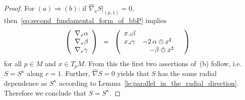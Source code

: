 \documentclass[11pt,a4paper]{article}
\theoremstyle{plain}
\theoremstyle{remark}
\begin{document}
\begin{proof}
For $(a)\Rightarrow (b)$: if $\hat\nabla_x S|_{(p,1)} = 0$, then~\eqref{eq:second_fundamental_form_of_bbP} implies
\begin{equation*}
\left (  \begin{array}{l}
 \nabla_x \alpha \\
\nabla_x\beta\\
\nabla_x\gamma
\end{array} \right )\;\;=\;\;\left (  \begin{array}{lll}
x\lrcorner \beta & & \\
x\lrcorner \gamma  & - 2\,  \alpha\owedge x^\sharp  &\\
&\quad - \beta  \owedge x^\sharp &
\end{array} \right )
 \end{equation*}
for all $p\in M$ and $x\in T_pM$. From this the first two assertions of~(b)
follow, i.e. $S = S^\kappa$ along $r = 1$. Further, $\hat\nabla S = 0$ yields
that $S$ has the same radial dependence as $S^\kappa$ according to Lemma~\ref{le:parallel_in_the_radial_direction}.
Therefore we conclude that $S = S^\kappa$.


\end{proof}
\end{document}
